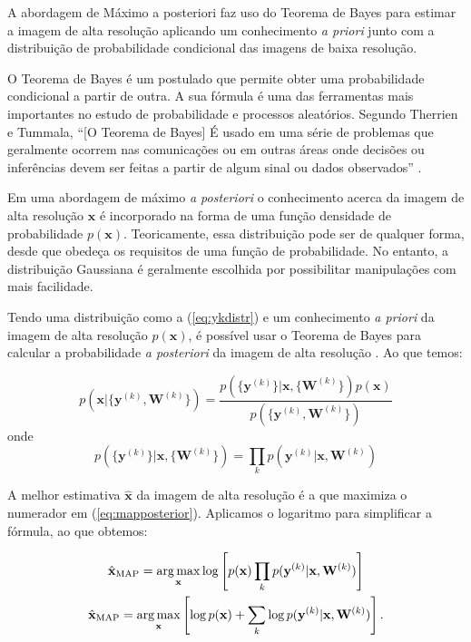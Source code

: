 A abordagem de Máximo a posteriori faz uso do Teorema de Bayes para estimar a imagem
de alta resolução aplicando um 
conhecimento \emph{a priori} junto com a distribuição de probabilidade condicional
das imagens de baixa resolução.

O Teorema de Bayes é um postulado que permite obter uma probabilidade condicional a
partir de outra.
A sua fórmula é uma das ferramentas mais importantes no estudo de probabilidade e
processos aleatórios.
Segundo Therrien e Tummala, “[O Teorema de Bayes] É usado em uma série de problemas que
geralmente ocorrem nas comunicações ou em outras áreas onde decisões ou inferências
devem ser feitas a partir de algum sinal ou dados observados” \cite{therrien2011probability}.

Em uma abordagem de máximo \emph{a posteriori} o conhecimento acerca da imagem de alta resolução $\mathbf{x}$ é incorporado na forma de uma função densidade de probabilidade $p(\mathbf{x})$.
Teoricamente, essa distribuição pode ser de qualquer forma, desde que obedeça os requisitos de uma função de probabilidade.
No entanto, a distribuição Gaussiana é geralmente escolhida por possibilitar manipulações com mais facilidade.


Tendo uma distribuição como a (\ref{eq:ykdistr}) e um conhecimento \emph{a priori} da imagem de alta resolução $p(\mathbf{x})$, é possível usar o Teorema de Bayes para calcular a probabilidade \emph{a posteriori} da imagem de alta resolução \cite{nasrollahi2014super,pickup2007bayesian,pickup2007bayesian2} . Ao que temos:

\begin{equation}
	\label{eq:mapposterior}
	p(\mathbf{x} | \{\mathbf{y}^{(k)}, \mathbf{W}^{(k)}\}) = \frac{p(\{\mathbf{y}^{(k)}\} | \mathbf{x}, \{\mathbf{W}^{(k)}\}) p(\mathbf{x})}
	{p(\{\mathbf{y}^{(k)}, \mathbf{W}^{(k)}\})}
\end{equation}
onde
\begin{equation}
	p(\{\mathbf{y}^{(k)}\} | \mathbf{x}, \{\mathbf{W}^{(k)}\}) = 
	\prod_k p(\mathbf{y}^{(k)} | \mathbf{x}, \mathbf{W}^{(k)})
\end{equation}

A melhor estimativa $\hat{\mathbf{x}}$ da imagem de alta resolução é a que maximiza o numerador em (\ref{eq:mapposterior}).
Aplicamos o logaritmo para simplificar a fórmula, ao que obtemos:

\begin{gather}
	\hat{\mathbf{x}}_{\mathrm{MAP}} = \operatorname*{arg\,max}_{\mathbf{x}} \log \left[ p(\mathbf{x}) \prod_k p(\mathbf{y}^{(k)} | \mathbf{x}, \mathbf{W}^{(k)}) \right] \\
	\hat{\mathbf{x}}_{\mathrm{MAP}} = \operatorname*{arg\,max}_{\mathbf{x}} \left[ \log p(\mathbf{x}) + \sum_k \log p(\mathbf{y}^{(k)} | \mathbf{x}, \mathbf{W}^{(k)}) \right].
\end{gather}

